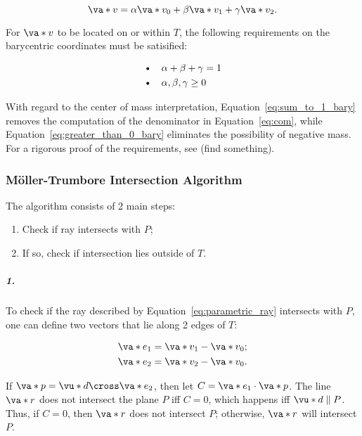 \begin{equation}
\va*{v} = \alpha \va*{v_0} + \beta \va*{v_1} + \gamma \va*{v_2}.
\label{eq:v_on_plane_bary}
\end{equation}

\noindent For $\va*{v}$ to be located on or within $T$, the following requirements on the barycentric coordinates must be satisified:

\begin{align}
  &\text{\textbullet}\quad \alpha + \beta + \gamma = 1 \label{eq:sum_to_1_bary}\\
  &\text{\textbullet}\quad \alpha, \beta, \gamma \geq 0 \label{eq:greater_than_0_bary}
\end{align}

With regard to the center of mass interpretation, Equation~\ref{eq:sum_to_1_bary} removes the computation of the denominator in Equation~\ref{eq:com}, while Equation~\ref{eq:greater_than_0_bary} eliminates the possibility of negative mass. For a rigorous proof of the requirements, see (find something).

\subsubsection*{Möller-Trumbore Intersection Algorithm}
\par The algorithm consists of 2 main steps:

\begin{enumerate}
  \item Check if ray intersects with $P$;
  \item If so, check if intersection lies outside of $T$.
\end{enumerate}

\subparagraph{1.}
\par To check if the ray described by Equation~\ref{eq:parametric_ray} intersects with $P$, one can define two vectors that lie along 2 edges of $T$:

\begin{align}
  \va*{e_1} &= \va*{v_1} - \va*{v_0} \label{eq:e_1_bary};\\
  \va*{e_2} &= \va*{v_2} - \va*{v_0} \label{eq:e_2_bary}.
\end{align}

\noindent If $\va*{p} = \vu*{d} \cross \va*{e_2}$, then let $C = \va*{e_1} \cdot \va*{p}$. The line $\va*{r}$ does not intersect the plane $P$ iff $C = 0$, which happens iff $\vu*{d} \parallel P$. Thus, if $C = 0$, then $\va*{r}$ does not intersect $P$; otherwise, $\va*{r}$ will intersect $P$.

